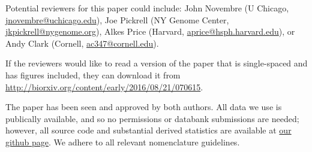 \documentclass[stdletter,letterpaper,addrfromright,orderfromdateto,dateleft,11pt,noaddrto,sigleft]{newlfm}
\begin{document}
\begin{newlfm}
Potential reviewers for this paper could include:
John Novembre (U Chicago, \href{mailto:jnovembre@uchicago.edu}{jnovembre@uchicago.edu}),
Joe Pickrell (NY Genome Center, \href{mailto:jkpickrell@nygenome.org}{jkpickrell@nygenome.org}),
Alkes Price (Harvard, \href{mailto:aprice@hsph.harvard.edu}{aprice@hsph.harvard.edu}),
or Andy Clark (Cornell, \href{mailto:ac347@cornell.edu}{ac347@cornell.edu}).

If the reviewers would like to read a version of the paper that is single-spaced and has figures included, 
they can download it from \url{http://biorxiv.org/content/early/2016/08/21/070615}.

The paper has been seen and approved by both authors.  
All data we use is publically available, and so no permissions or databank submissions are needed;
however, all source code and substantial derived statistics are available at 
\href{https://github.com/petrelharp/local_pca}{our github page}.
We adhere to all relevant nomenclature guidelines.




\end{newlfm}
\end{document}
